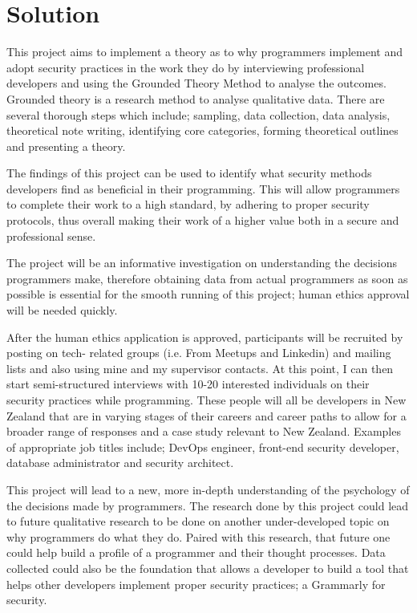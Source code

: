 \section{Solution}

\par This project aims to implement a theory as to why programmers implement and adopt security practices in the work they do by interviewing professional developers and using the Grounded Theory Method to analyse the outcomes. Grounded theory is a research method to analyse qualitative data. There are several thorough steps which include; sampling, data collection, data analysis, theoretical note writing, identifying core categories, forming theoretical outlines and presenting a theory.
\newline
\par The findings of this project can be used to identify what security methods developers find as beneficial in their programming. This will allow programmers to complete their work to a high standard, by adhering to proper security protocols, thus overall making their work of a higher value both in a secure and professional sense.
\newline
\par The project will be an informative investigation on understanding the decisions programmers make, therefore obtaining data from actual programmers as soon as possible is essential for the smooth running of this project; human ethics approval will be needed quickly.
\newline
\par After the human ethics application is approved, participants will be recruited by posting on tech- related groups (i.e. From Meetups and Linkedin) and mailing lists and also using mine and my supervisor contacts. At this point, I can then start semi-structured interviews with 10-20 interested individuals on their security practices while programming. These people will all be developers in New Zealand that are in varying stages of their careers and career paths to allow for a broader range of responses and a case study relevant to New Zealand. Examples of appropriate job titles include; DevOps engineer, front-end security developer, database administrator and security architect.
\newline
\par This project will lead to a new, more in-depth understanding of the psychology of the decisions made by programmers. The research done by this project could lead to future qualitative research to be done on another under-developed topic on why programmers do what they do. Paired with this research, that future one could help build a profile of a programmer and their thought processes. Data collected could also be the foundation that allows a developer to build a tool that helps other developers implement proper security practices; a Grammarly for security.